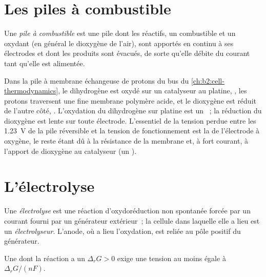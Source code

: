 \section{Les piles à combustible}

\begin{definition}\label{def:b2:batteries-electrolysis:fuel-cell}
Une \emph{pile à combustible} est une pile dont les réactifs, un combustible et un
oxydant (en général le dioxygène de l'air), sont apportés en continu à ses
électrodes et dont les produits sont évacués, de sorte qu'elle débite du courant tant
qu'elle est alimentée.
\end{definition}

Dans la pile à membrane échangeuse de protons du bus du
\cref{ch:b2:cell-thermodynamics}, le dihydrogène est oxydé sur un catalyseur au platine,
, les protons traversent une fine membrane polymère acide, et le dioxygène est
réduit de l'autre côté, . L'oxydation du dihydrogène
sur platine est un ~; la réduction du dioxygène est lente sur toute
électrode. L'essentiel de la tension perdue entre les \qty{1.23}{V} de la pile réversible
et la tension de fonctionnement est la  de l'électrode à oxygène,
le reste étant dû à la résistance de la membrane et, à fort courant, à l'apport de
dioxygène au catalyseur (un ).

\section{L'électrolyse}

\begin{definition}[Électrolyse]\label{def:b2:batteries-electrolysis:electrolysis}
Une \emph{électrolyse} est une réaction d'oxydoréduction non spontanée
forcée par un courant fourni par un générateur extérieur~; la cellule dans laquelle elle
a lieu est un \emph{électrolyseur}. L'anode, où a lieu
l'oxydation, est reliée au pôle positif du générateur.
\end{definition}

\begin{proposition}\label{prop:b2:batteries-electrolysis:minimum-voltage}
Une  dont la réaction a un $\Delta_r G > 0$ exige une tension au
moins égale à $\Delta_r G/(nF)$.
\end{proposition}

